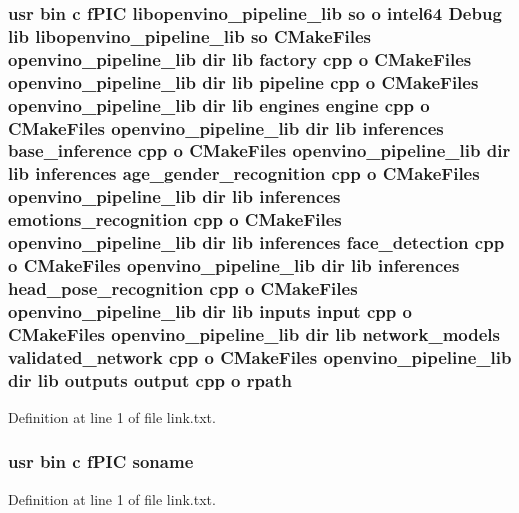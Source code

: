 \subsubsection[{\texorpdfstring{rpath}{rpath}}]{\setlength{\rightskip}{0pt plus 5cm}usr bin {\bf c} f\+P\+IC libopenvino\+\_\+pipeline\+\_\+lib {\bf so} o intel64 Debug lib libopenvino\+\_\+pipeline\+\_\+lib {\bf so} C\+Make\+Files {\bf openvino\+\_\+pipeline\+\_\+lib} dir lib factory cpp o C\+Make\+Files {\bf openvino\+\_\+pipeline\+\_\+lib} dir lib pipeline cpp o C\+Make\+Files {\bf openvino\+\_\+pipeline\+\_\+lib} dir lib engines engine cpp o C\+Make\+Files {\bf openvino\+\_\+pipeline\+\_\+lib} dir lib inferences base\+\_\+inference cpp o C\+Make\+Files {\bf openvino\+\_\+pipeline\+\_\+lib} dir lib inferences age\+\_\+gender\+\_\+recognition cpp o C\+Make\+Files {\bf openvino\+\_\+pipeline\+\_\+lib} dir lib inferences emotions\+\_\+recognition cpp o C\+Make\+Files {\bf openvino\+\_\+pipeline\+\_\+lib} dir lib inferences face\+\_\+detection cpp o C\+Make\+Files {\bf openvino\+\_\+pipeline\+\_\+lib} dir lib inferences head\+\_\+pose\+\_\+recognition cpp o C\+Make\+Files {\bf openvino\+\_\+pipeline\+\_\+lib} dir lib inputs input cpp o C\+Make\+Files {\bf openvino\+\_\+pipeline\+\_\+lib} dir lib network\+\_\+models validated\+\_\+network cpp o C\+Make\+Files {\bf openvino\+\_\+pipeline\+\_\+lib} dir lib outputs output cpp o rpath}\hypertarget{CMakeFiles_2openvino__pipeline__lib_8dir_2link_8txt_ab0a26402d9649150dd228d3d929b783f}{}\label{CMakeFiles_2openvino__pipeline__lib_8dir_2link_8txt_ab0a26402d9649150dd228d3d929b783f}


Definition at line 1 of file link.\+txt.

\subsubsection[{\texorpdfstring{soname}{soname}}]{\setlength{\rightskip}{0pt plus 5cm}usr bin {\bf c} f\+P\+IC soname}\hypertarget{CMakeFiles_2openvino__pipeline__lib_8dir_2link_8txt_ab65a9b6457c4853ed17f89f945516e66}{}\label{CMakeFiles_2openvino__pipeline__lib_8dir_2link_8txt_ab65a9b6457c4853ed17f89f945516e66}


Definition at line 1 of file link.\+txt.

